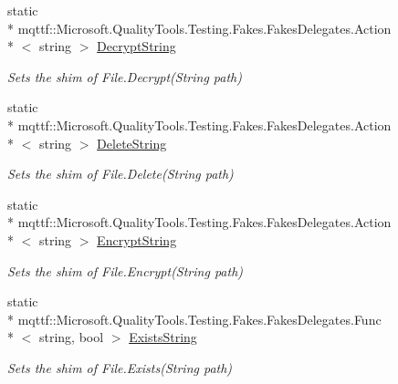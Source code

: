 \begin{DoxyCompactItemize}
static \\*
mqttf\-::\-Microsoft.\-Quality\-Tools.\-Testing.\-Fakes.\-Fakes\-Delegates.\-Action\\*
$<$ string $>$ \hyperlink{class_system_1_1_i_o_1_1_fakes_1_1_shim_file_a2e80c411416c0fed37d2b66659927ba4}{Decrypt\-String}
\begin{DoxyCompactList}\small\item\em Sets the shim of File.\-Decrypt(\-String path)\end{DoxyCompactList}\item 
static \\*
mqttf\-::\-Microsoft.\-Quality\-Tools.\-Testing.\-Fakes.\-Fakes\-Delegates.\-Action\\*
$<$ string $>$ \hyperlink{class_system_1_1_i_o_1_1_fakes_1_1_shim_file_a5e7a39294adb6c2937a4736da0a22925}{Delete\-String}
\begin{DoxyCompactList}\small\item\em Sets the shim of File.\-Delete(\-String path)\end{DoxyCompactList}\item 
static \\*
mqttf\-::\-Microsoft.\-Quality\-Tools.\-Testing.\-Fakes.\-Fakes\-Delegates.\-Action\\*
$<$ string $>$ \hyperlink{class_system_1_1_i_o_1_1_fakes_1_1_shim_file_a165a68e48bc88ef3c6adf8a5d4abcf8d}{Encrypt\-String}
\begin{DoxyCompactList}\small\item\em Sets the shim of File.\-Encrypt(\-String path)\end{DoxyCompactList}\item 
static \\*
mqttf\-::\-Microsoft.\-Quality\-Tools.\-Testing.\-Fakes.\-Fakes\-Delegates.\-Func\\*
$<$ string, bool $>$ \hyperlink{class_system_1_1_i_o_1_1_fakes_1_1_shim_file_ab77495fbb33f9fcaa27fd8b3d0b0cda0}{Exists\-String}
\begin{DoxyCompactList}\small\item\em Sets the shim of File.\-Exists(\-String path)\end{DoxyCompactList}\item 

\end{DoxyCompactItemize}
